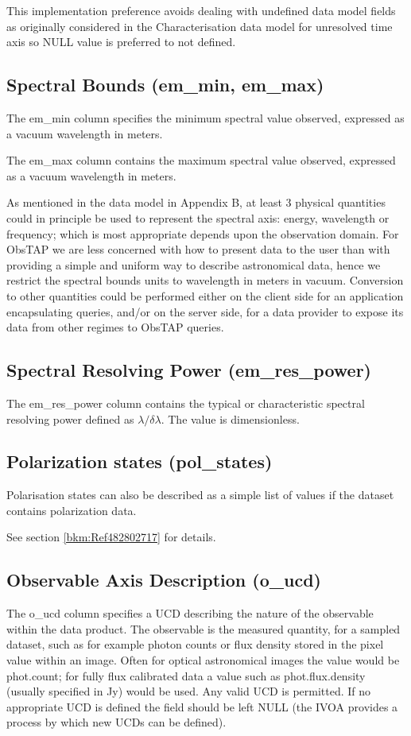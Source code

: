 \documentclass[11pt,a4paper]{ivoa}
\begin{document}
This implementation preference avoids dealing with undefined data model fields as originally considered in the
Characterisation data model for unresolved time axis so NULL value is preferred to not defined. 

\subsection{Spectral Bounds (em\_min, em\_max)}
\label{bkm:Ref285651639}The em\_min column specifies the minimum spectral value observed, expressed as a vacuum
wavelength in meters.

The em\_max column contains the maximum spectral value observed, expressed as a vacuum wavelength in meters.

As mentioned in the data model in Appendix B, at least 3 physical quantities could in principle be used to represent the
spectral axis: energy, wavelength or frequency; which is most appropriate depends upon the observation domain.  For
ObsTAP we are less concerned with how to present data to the user than with providing a simple and uniform way to
describe astronomical data, hence we restrict the spectral bounds units to wavelength in meters in vacuum.  Conversion
to other quantities could be performed either on the client side for an application encapsulating queries, and/or on
the server side, for a data provider to expose its data from other regimes to ObsTAP queries.

\subsection{Spectral Resolving Power (em\_res\_power)}
The em\_res\_power column contains the typical or characteristic spectral resolving power defined as
${\lambda}/{\delta}{\lambda}$.  The value is dimensionless. 

\subsection{Polarization states (pol\_states)}
Polarisation states can also be described as a simple list of values if the dataset contains polarization data. 

See section  \ref{bkm:Ref482802717} for details.  

\subsection{Observable Axis Description (o\_ucd)}
The o\_ucd column specifies a UCD \citep{2007ivoa.spec.0402P} describing the nature of the observable within the data
product.  The observable is the measured quantity, for a sampled dataset, such as for example photon counts or flux
density stored in the pixel value within an image. Often for optical astronomical images the value would be phot.count;
for fully flux calibrated data a value such as phot.flux.density (usually specified in Jy) would be used. Any valid UCD
is permitted.  If no appropriate UCD is defined the field should be left NULL (the IVOA provides a process by which new
UCDs can be defined).
\end{document}

